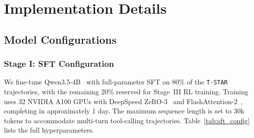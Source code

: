 \documentclass[11pt]{article}
\begin{document}


\clearpage

\appendix

\section{Implementation Details}
\label{app:implementation}
\subsection{Model Configurations}

\subsubsection{Stage I: SFT Configuration}

We fine-tune Qwen3.5-4B~\citep{qwen35blog} with full-parameter SFT on 80\% of the \texttt{T-STAR} trajectories, with the remaining 20\% reserved for Stage~III RL training.
Training uses 32 NVIDIA A100 GPUs with DeepSpeed ZeRO-3~\citep{rajbhandari2020zero} and FlashAttention-2~\citep{dao2024flashattention}, completing in approximately 1 day.
The maximum sequence length is set to 30k tokens to accommodate multi-turn tool-calling trajectories.
Table~\ref{tab:sft_config} lists the full hyperparameters.

\begin{table}[htbp]
\centering
\small
\caption{Hyperparameters for Stage~I SFT.}
\label{tab:sft_config}
\end{table}
\end{document}
